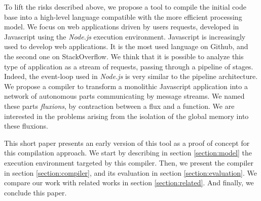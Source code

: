 To lift the risks described above, we propose a tool to compile the initial code base into a high-level language compatible with the more efficient processing model.
We focus on web applications driven by users requests, developed in Javascript using the \textit{Node.js} execution environment.
Javascript is increasingly used to develop web applications.
It is the most used language on Github, and the second one on StackOverflow.
We think that it is possible to analyze this type of application as a stream of requests, passing through a pipeline of stages.
Indeed, the event-loop used in \textit{Node.js} is very similar to the pipeline architecture.
We propose a compiler to transform a monolithic Javascript application into a network of autonomous parts communicating by message streams.
We named these parts \textit{fluxions}, by contraction between a flux and a function.
We are interested in the problems arising from the isolation of the global memory into these fluxions.

This short paper presents an early version of this tool as a proof of concept for this compilation approach.
We start by describing in section \ref{section:model} the execution environment targeted by this compiler.
Then, we present the compiler in section \ref{section:compiler}, and its evaluation in section \ref{section:evaluation}.
We compare our work with related works in section \ref{section:related}.
And finally, we conclude this paper.